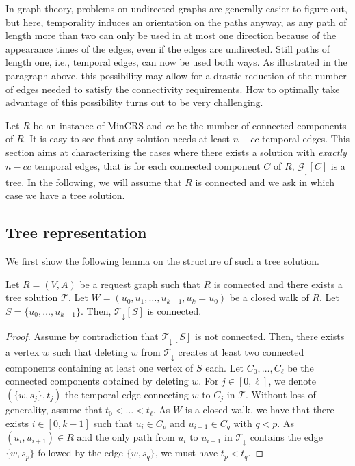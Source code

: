\documentclass[11pt]{article}%
\newcommand{\G}{\mathcal{G}}
\begin{document}
In graph theory, problems on undirected graphs are generally easier to figure out, but here, temporality induces an orientation on the paths anyway, as any path of length more than two can only be used in at most one direction because of the appearance times of the edges, even if the edges are undirected. 
Still paths of length one, i.e., temporal edges, can now be used both ways. As illustrated in the paragraph above, this possibility may allow for a drastic reduction of the number of edges needed to satisfy the connectivity requirements. How to optimally take advantage of this possibility turns out to be very challenging.

Let $R$ be an instance of MinCRS and $cc$ be the number of connected components of $R$. It is easy to see that any solution needs at least $n-cc$ temporal edges. This section aims at characterizing the cases where there exists a solution with {\it exactly} $n-cc$ temporal edges, that is for each connected component $C$ of $R$, $\G_\downarrow[C]$ is a tree. In the following, we will assume that $R$ is connected and we ask in which case we have a tree solution. 


\subsection{Tree representation}

We first show the following lemma on the structure of such a tree solution. 



\begin{lemma}
\label{lemma:closed_walk}
Let $R=(V,A)$ be a request graph such that $R$ is connected and there exists a tree solution $\mathcal{T}$. Let $W=(u_0,u_1,\dots,u_{k-1},u_k=u_0)$ be a closed walk of $R$. Let $S=\{u_0,\dots,u_{k-1}\}$. Then, $\mathcal{T}_{\downarrow}[S]$ is connected. 
\end{lemma}

\begin{proof}
Assume by contradiction that $\mathcal{T}_\downarrow[S]$ is not connected. Then, there exists a vertex $w$ such that deleting $w$ from $\mathcal{T}_\downarrow$ creates at least two connected components containing at least one vertex of $S$ each. Let $C_0,\dots,C_\ell$ be the connected components obtained by deleting $w$. For $j\in [0,\ell]$, we denote $(\{w,s_j\},t_j)$ the temporal edge connecting $w$ to $C_j$ in $\mathcal{T}$. Without loss of generality, assume that $t_0<\dots<t_\ell$. As $W$ is a closed walk, we have that there exists $i\in [0,k-1]$ such that $u_i\in C_p$ and $u_{i+1}\in C_q$ with $q<p$. As $(u_i,u_{i+1})\in R$ and the only path from $u_{i}$ to $u_{i+1}$ in $\mathcal{T}_\downarrow$ contains the edge $\{w,s_p\}$ followed by the edge $\{w,s_q\}$, we must have $t_p<t_q$.\qedhere
 
\end{proof}
\end{document}
